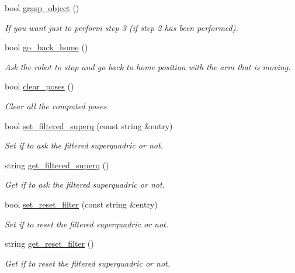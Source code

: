 \begin{DoxyCompactItemize}
bool \hyperlink{classExperimentOne_a9a2ab97ed5ae9420e352a20b01feda90}{grasp\-\_\-object} ()
\begin{DoxyCompactList}\small\item\em If you want just to perform step 3 (if step 2 has been performed). \end{DoxyCompactList}\item 
bool \hyperlink{classExperimentOne_a967da7276e9bee19c45c8a000bf1cb01}{go\-\_\-back\-\_\-home} ()
\begin{DoxyCompactList}\small\item\em Ask the robot to stop and go back to home position with the arm that is moving. \end{DoxyCompactList}\item 
bool \hyperlink{classExperimentOne_a827996b603991113f08c928ccd7e7793}{clear\-\_\-poses} ()
\begin{DoxyCompactList}\small\item\em Clear all the computed poses. \end{DoxyCompactList}\item 
bool \hyperlink{classExperimentOne_a88d1dd39e2a145d6042bd6d2203a69eb}{set\-\_\-filtered\-\_\-superq} (const string \&entry)
\begin{DoxyCompactList}\small\item\em Set if to ask the filtered superquadric or not. \end{DoxyCompactList}\item 
string \hyperlink{classExperimentOne_a4fcbf7d582b26a64f67fc7d05f578e41}{get\-\_\-filtered\-\_\-superq} ()
\begin{DoxyCompactList}\small\item\em Get if to ask the filtered superquadric or not. \end{DoxyCompactList}\item 
bool \hyperlink{classExperimentOne_a9a0ab63f624d2ec7f36f765b3102050e}{set\-\_\-reset\-\_\-filter} (const string \&entry)
\begin{DoxyCompactList}\small\item\em Set if to reset the filtered superquadric or not. \end{DoxyCompactList}\item 
string \hyperlink{classExperimentOne_a3573bd59ace3a48477beefb75d544326}{get\-\_\-reset\-\_\-filter} ()
\begin{DoxyCompactList}\small\item\em Get if to reset the filtered superquadric or not. \end{DoxyCompactList}\item 

\end{DoxyCompactItemize}
